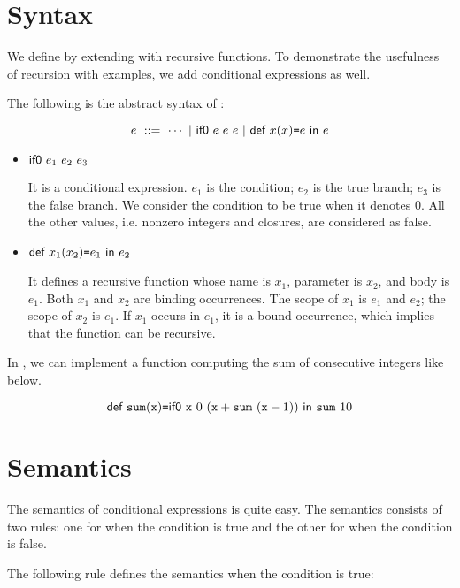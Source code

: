 \section{Syntax}

We define \lang by extending \plang with recursive functions. To demonstrate the
usefulness of recursion with examples, we add conditional expressions as well.

The following is the abstract syntax of \lang:

\[
  e\ ::=\ \cdots\ |\ \eifz{e}{e}{e}\ |\ \erec{x}{x}{e}{e}
\]

\begin{itemize}
  \item $\textsf{if0}\ e_1\ e_2\ e_3$

    It is a conditional expression. $e_1$ is the condition; $e_2$ is the true
    branch; $e_3$ is the false branch. We consider the condition to be true when
    it denotes $0$. All the other values, i.e. nonzero integers and closures,
    are considered as false.

  \item $\textsf{def}\ x_1(x_2)\texttt{=} e_1\ \textsf{in}\ e_2$

    It defines a recursive function whose name is $x_1$, parameter is $x_2$, and
    body is $e_1$. Both $x_1$ and $x_2$ are binding occurrences. The scope of
    $x_1$ is $e_1$ and $e_2$; the scope of $x_2$ is $e_1$. If $x_1$ occurs in
    $e_1$, it is a bound occurrence, which implies that the function can be
    recursive.
\end{itemize}

In \lang, we can implement a function computing the sum of consecutive integers
like below.

\[\textsf{def}\ \texttt{sum}(\texttt{x})\texttt{=}\textsf{if0}\ \texttt{x}\ 0\ (\texttt{x}+\texttt{sum}\ (\texttt{x}-1))\ \textsf{in}\ \texttt{sum}\ 10\]

\section{Semantics}

The semantics of conditional expressions is quite easy. The semantics consists
of two rules: one for when the condition is true and the other for when the
condition is false.

The following rule defines the semantics when the condition is true:


